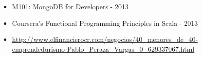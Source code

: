 \documentclass[a4paper,10pt]{article}
\begin{document}
\section*{\textcolor{primary}{\desarrolloProfesional}}
\begin{itemize}
    \item M101: MongoDB for Developers - 2013
    \item Coursera’s Functional Programming Principles in Scala - 2013
    \item \elfinanciero
    \url{http://www.elfinancierocr.com/negocios/40_menores_de_40-emprendedurismo-Pablo_Peraza_Vargas_0_629337067.html}
\end{itemize}
\end{document}
